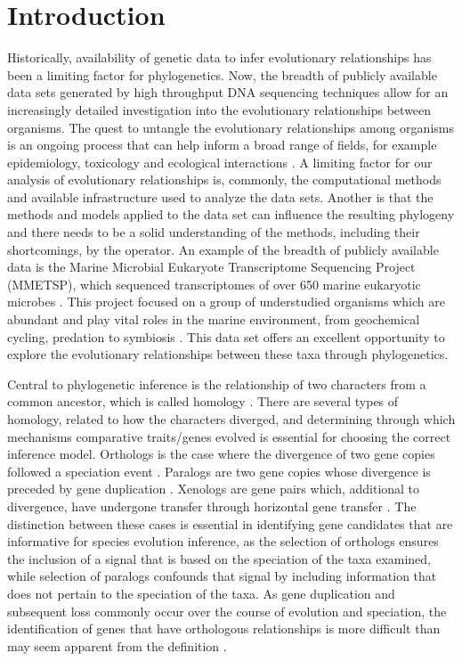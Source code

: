 \documentclass[12pt]{article}
\begin{document}
\section{Introduction}
Historically, availability of genetic data to infer evolutionary relationships has been a limiting factor for phylogenetics.
Now, the breadth of publicly available data sets generated by high throughput DNA sequencing techniques allow for an increasingly detailed investigation into the evolutionary relationships between organisms.
The quest to untangle the evolutionary relationships among organisms is an ongoing process that can help inform a broad range of fields, for example epidemiology, toxicology and ecological interactions \cite{mctavish2017and}.
A limiting factor for our analysis of evolutionary relationships is, commonly, the computational methods and available infrastructure used to analyze the data sets. 
Another is that the methods and models applied to the data set can influence the resulting phylogeny and there needs to be a solid understanding of the methods, including their shortcomings, by the operator.
An example of the breadth of publicly available data is the Marine Microbial Eukaryote Transcriptome Sequencing Project (MMETSP), which sequenced transcriptomes of over 650 marine eukaryotic microbes \cite{keeling2014marine}. 
This project focused on a group of understudied organisms which are abundant and play vital roles in the marine environment, from geochemical cycling, predation to symbiosis \cite{gomez2005list,gomez2012quantitative}. 
This data set offers an excellent opportunity to explore the evolutionary relationships between these taxa through phylogenetics. 

Central to phylogenetic inference is the relationship of two characters from a common ancestor, which is called homology \cite{fitch2000homology}. 
There are several types of homology, related to how the characters diverged, and determining through which mechanisms comparative traits/genes evolved is essential for choosing the correct inference model. 
Orthologs is the case where the divergence of two gene copies followed a speciation event \cite{fitch1970distinguishing}. 
Paralogs are two gene copies whose divergence is preceded by gene duplication \cite{fitch1970distinguishing}.
Xenologs are gene pairs which, additional to divergence, have undergone transfer through horizontal gene transfer \cite{darby2016xenolog}.
The distinction between these cases is essential in identifying gene candidates that are informative for species evolution inference, as the selection of orthologs ensures the inclusion of a signal that is based on the speciation of the taxa examined, while selection of paralogs confounds that signal by including information that does not pertain to the speciation of the taxa. 
As gene duplication and subsequent loss commonly occur over the course of evolution and speciation, the identification of genes that have orthologous relationships is more difficult than may seem apparent from the definition \cite{gabaldon2008large}. 
\end{document}
